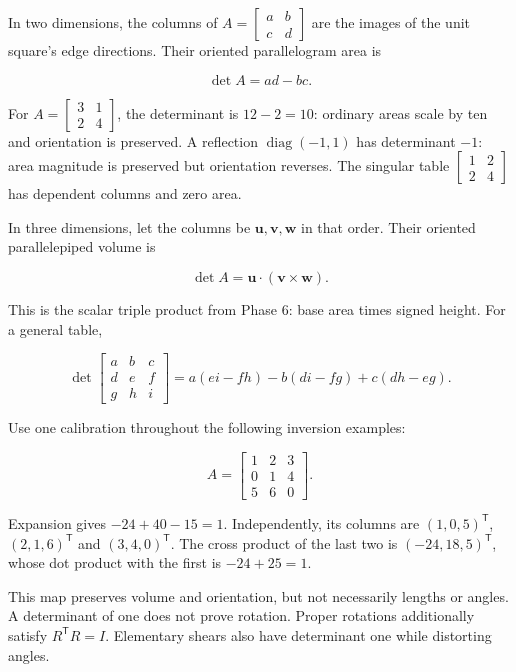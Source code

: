 In two dimensions, the columns of \(A=\begin{bmatrix}a&b\\c&d\end{bmatrix}\) are the images of the unit square's edge directions. Their oriented parallelogram area is

\[
\det A=ad-bc.
\]

For \(A=\begin{bmatrix}3&1\\2&4\end{bmatrix}\), the determinant is \(12-2=10\): ordinary areas scale by ten and orientation is preserved. A reflection \(\operatorname{diag}(-1,1)\) has determinant \(-1\): area magnitude is preserved but orientation reverses. The singular table \(\begin{bmatrix}1&2\\2&4\end{bmatrix}\) has dependent columns and zero area.

In three dimensions, let the columns be \(\mathbf u,\mathbf v,\mathbf w\) in that order. Their oriented parallelepiped volume is

\[
\det A=\mathbf u\cdot(\mathbf v\times\mathbf w).
\]

This is the scalar triple product from Phase 6: base area times signed height. For a general table,

\[
\det\begin{bmatrix}a&b&c\\d&e&f\\g&h&i\end{bmatrix}
=a(ei-fh)-b(di-fg)+c(dh-eg).
\]

Use one calibration throughout the following inversion examples:

\[
A=\begin{bmatrix}1&2&3\\0&1&4\\5&6&0\end{bmatrix}.
\]

Expansion gives \(-24+40-15=1\). Independently, its columns are \((1,0,5)^{\mathsf T}\), \((2,1,6)^{\mathsf T}\) and \((3,4,0)^{\mathsf T}\). The cross product of the last two is \((-24,18,5)^{\mathsf T}\), whose dot product with the first is \(-24+25=1\).

This map preserves volume and orientation, but not necessarily lengths or angles. A determinant of one does not prove rotation. Proper rotations additionally satisfy \(R^{\mathsf T}R=I\). Elementary shears also have determinant one while distorting angles.


